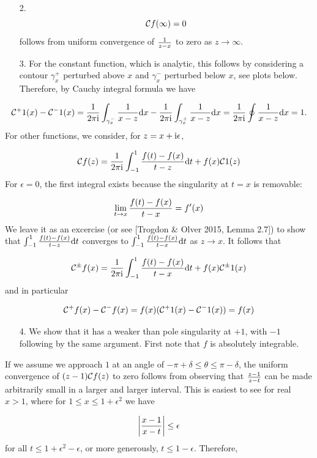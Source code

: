 \documentclass[12pt,a4paper]{article}
\def\D{ {\rm d} }
\def\I{ {\rm i} }
\def\CC{ {\cal C} }
\def\dx{\D x}
\def\dt{\D t}
\begin{document}
\begin{itemize}
\item[2. ] \[
{\cal C} f(\infty) = 0
\]
follows from uniform convergence of $1 \over z - x$ to zero as $z \rightarrow \infty$.


\item[3. ] For the constant function, which is analytic, this follows by considering a contour $\gamma_x^+$ perturbed above $x$ and $\gamma_x^-$ perturbed below $x$, see plots below.  Therefore, by Cauchy integral formula we have

\end{itemize}
\[
\CC^+ 1 (x) - \CC^- 1 (x) = {1 \over 2 \pi \I}\int_{\gamma_x^-} {1 \over x - z} \dx - {1 \over 2 \pi \I}\int_{\gamma_x^+} {1 \over x - z} \dx = {1 \over 2 \pi \I} \oint {1 \over x -z } \dx = 1.
\]
For other functions, we consider, for $z = x + \I \epsilon$,

\[
    {\cal C} f(z) =   {1 \over 2 \pi \I} \int_{-1}^1 {f(t) - f(x) \over t - z} \dt + f(x) \CC 1(z)
\]
For $\epsilon = 0$, the first integral exists because the singularity at $t = x$ is removable: 

\[
\lim_{t \rightarrow x} {f(t) - f(x) \over t - x} = f'(x)
\]
We leave it as an excercise (or see [Trogdon \& Olver 2015, Lemma 2.7]) to show that $\int_{-1}^1 {f(t) - f(x) \over t - z} \dt$ converges to $\int_{-1}^1 {f(t) - f(x) \over t - x} \dt$ as $z \rightarrow x$. It follows that

\[
{\cal C}^\pm f(x) =   {1 \over 2 \pi \I} \int_{-1}^1 {f(t) - f(x) \over t - x} \dt + f(x) \CC^\pm 1(x)
\]
and in particular

\[
{\cal C}^+ f(x) - {\cal C}^- f(x)  =  f(x) (\CC^+ 1(x) - \CC^- 1(x)) = f(x)
\]
\begin{itemize}
\item[4. ] We show that it has a weaker than pole singularity at $+1$, with $-1$ following by the same argument. First note that $f$ is absolutely integrable. 

\end{itemize}
If we assume we approach $1$ at an angle of $-\pi + \delta \leq \theta \leq \pi - \delta$, the uniform convergence of $(z - 1) \CC f(z)$ to zero follows from observing that ${z-1 \over z - t}$ can be made arbitrarily small in a larger and larger interval. This is easiest to see for real $x > 1$, where for  $1 \leq x \leq 1 + \epsilon^2$ we have

\[
\left|{x -1 \over x-t }\right| \leq \epsilon
\]
for all $t \leq 1 + \epsilon^2 - \epsilon$, or more generously, $t \leq 1 - \epsilon$. Therefore,
\end{document}
